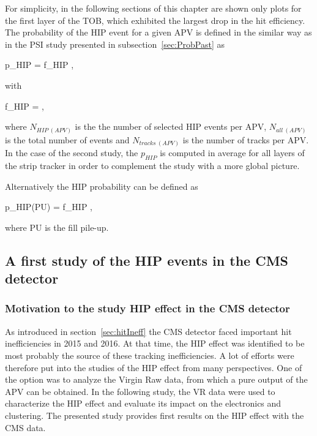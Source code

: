
For simplicity, in the following sections of this chapter are shown only plots for the first layer of the TOB, which exhibited the largest drop in the hit efficiency. The probability of the HIP event for a given APV is defined in the similar way as in the PSI study presented in subsection~\ref{sec:ProbPast} as


{
p_{HIP} = f_{HIP} ,
}

with


{
f_{HIP} = ,
}


where $N_{HIP~(APV)}$ is the the number of selected HIP events per APV, $N_{all~(APV)}$ is the total number of events and $N_{tracks~(APV)}$ is the number of tracks per APV. In the case of the second study, the $p_{HIP}$ is computed in average for all layers of the strip tracker in order to complement the study with a more global picture.

Alternatively the HIP probability can be defined as

{
p_{HIP}(PU) = f_{HIP} ,
}

where PU is the fill pile-up. 



\subsection{A first study of the HIP events in the CMS detector~\label{sec:firstStudy}}

\subsubsection{Motivation to the study HIP effect in the CMS detector}

As introduced in section~\ref{sec:hitIneff} the CMS detector faced important hit inefficiencies in 2015 and 2016. At that time, the HIP effect was identified to be most probably the source of these tracking inefficiencies. A lot of efforts were therefore put into the studies of the HIP effect from many perspectives. One of the option was to analyze the Virgin Raw data, from which a pure output of the APV can be obtained. In the following study, the VR data were used to characterize the HIP effect and evaluate its impact on the electronics and clustering. The presented study provides first results on the HIP effect with the CMS data.

